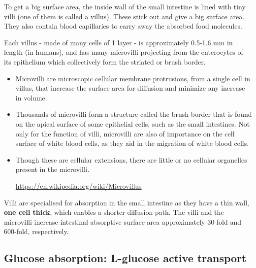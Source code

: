 To get a big surface area, the inside wall of the small intestine is lined with
tiny villi (one of them is called a villus). These stick out and give a big
surface area. They also contain blood capillaries to carry away the absorbed
food molecules.

Each villus - made of many cells of 1 layer - is approximately 0.5-1.6 mm in
length (in humans), and has many microvilli projecting from the enterocytes of
its epithelium which collectively form the striated or brush border.
\begin{itemize} 

   \item Microvilli are microscopic cellular membrane protrusions, from a single
   cell in villus, that increase the surface area for diffusion and minimize any
   increase in volume.
 
   \item Thousands of microvilli form a structure called the brush border that
   is found on the apical surface of some epithelial cells, such as the small
   intestines. Not only for the function of villi, microvilli are also of
   importance on the cell surface of white blood cells, as they aid in the
   migration of white blood cells.

  \item  Though these are cellular extensions, there are little or no cellular
  organelles present in the microvilli.
  
  \url{https://en.wikipedia.org/wiki/Microvillus}
\end{itemize}

Villi are specialised for absorption in the small intestine as they have a thin
wall, {\bf one cell thick}, which enables a shorter diffusion path.  The villi
and the microvilli increase intestinal absorptive surface area approximately
30-fold and 600-fold, respectively.


\subsection{Glucose absorption: L-glucose active transport}
\label{sec:glucose-active-transport}

